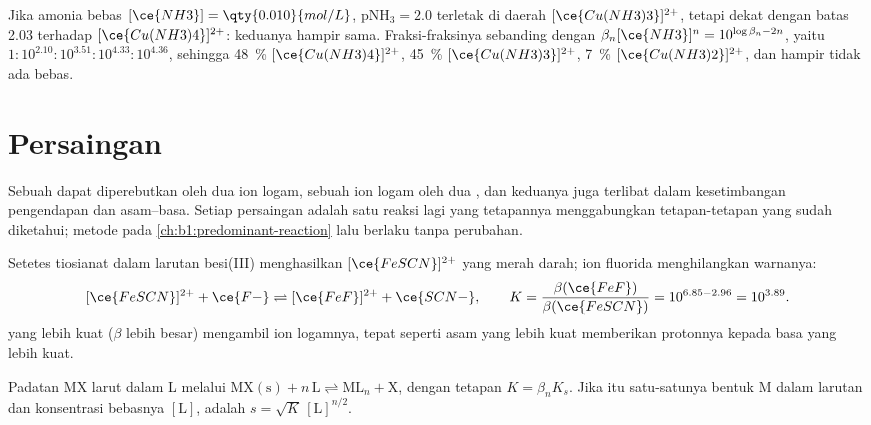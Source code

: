 \begin{example}\label{ex:b1:complexation:cu}
Jika amonia bebas $[\ce{NH3}] = \qty{0.010}{mol/L}$, $\mathrm{pNH_3} = 2.0$
terletak di daerah $[\ce{Cu(NH3)3}]^{2+}$, tetapi dekat dengan batas 2.03
terhadap $[\ce{Cu(NH3)4}]^{2+}$: keduanya hampir sama. Fraksi-fraksinya
sebanding dengan $\beta_n[\ce{NH3}]^n = 10^{\log\beta_n - 2n}$, yaitu
$1 : 10^{2.10} : 10^{3.51} : 10^{4.33} : 10^{4.36}$, sehingga \qty{48}{\percent}
$[\ce{Cu(NH3)4}]^{2+}$, \qty{45}{\percent} $[\ce{Cu(NH3)3}]^{2+}$,
\qty{7}{\percent} $[\ce{Cu(NH3)2}]^{2+}$, dan hampir tidak ada 
bebas.
\end{example}

\section{Persaingan}

Sebuah  dapat diperebutkan oleh dua ion logam, sebuah ion logam oleh
dua , dan keduanya juga terlibat dalam kesetimbangan pengendapan dan
asam--basa. Setiap persaingan adalah satu reaksi lagi yang tetapannya
menggabungkan tetapan-tetapan yang sudah diketahui; metode  pada \cref{ch:b1:predominant-reaction} lalu berlaku tanpa
perubahan.

\begin{example}\label{ex:b1:complexation:scn-f}
Setetes tiosianat dalam larutan besi(III) menghasilkan
$[\ce{FeSCN}]^{2+}$ yang merah darah; ion fluorida menghilangkan warnanya:
\[
  [\ce{FeSCN}]^{2+} + \ce{F-} \rightleftharpoons [\ce{FeF}]^{2+} + \ce{SCN-},
  \qquad K = \frac{\beta(\ce{FeF})}{\beta(\ce{FeSCN})} = 10^{6.85 - 2.96} =
  10^{3.89} .
\]
 yang lebih kuat ($\beta$ lebih besar) mengambil ion logamnya,
tepat seperti asam yang lebih kuat memberikan protonnya kepada basa yang
lebih kuat.
\end{example}

\begin{proposition}\label{prop:b1:complexation:competition-precipitation}
Padatan MX larut dalam  L melalui
$\mathrm{MX(s)} + n\,\mathrm{L} \rightleftharpoons \mathrm{ML}_n + \mathrm{X}$,
dengan tetapan $K = \beta_n K_s$. Jika  itu satu-satunya bentuk M
dalam larutan dan konsentrasi  bebasnya $[\mathrm{L}]$, 
adalah $s = \sqrt{K}\,[\mathrm{L}]^{n/2}$.
\end{proposition}

